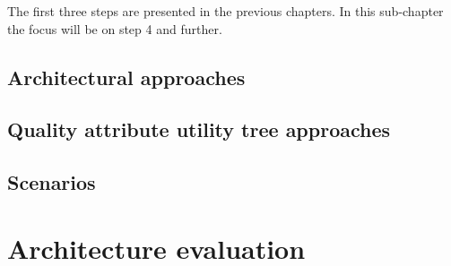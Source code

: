 The first three steps are presented in the previous chapters. In this sub-chapter the focus will be on step 4 and further. 

\subsection{Architectural approaches}

\subsection{Quality attribute utility tree approaches}

\subsection{Scenarios}


\clearpage
\section{Architecture evaluation}


